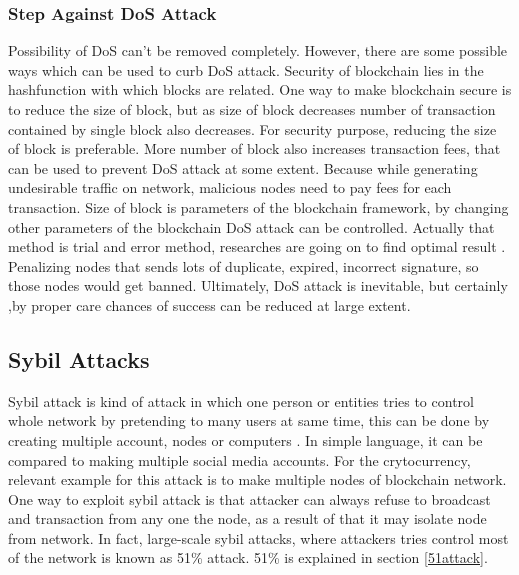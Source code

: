 \documentclass[a4paper,twoside,12pt]{report}
\begin{document}
\begin{spacing}{1.5}
\subsubsection{Step Against DoS Attack}
Possibility of DoS can't be removed completely. However, there are some possible ways which can be used to curb DoS attack. Security of blockchain lies in the hashfunction with which blocks are related. 
One way to make blockchain secure is to reduce the size of block, but as size of block decreases number of transaction contained by single block also decreases. For security purpose, reducing the size of block is preferable. More number of block also increases transaction fees, that can be used to prevent DoS attack at some extent. Because while generating undesirable traffic on network, malicious nodes need to pay fees for each transaction. Size of block is parameters of the blockchain framework, by changing other parameters of the blockchain DoS attack can be controlled. Actually that method is trial and error method, researches are going on to find optimal result \cite{zaghloul_beginners_2018}. Penalizing nodes that sends lots of duplicate, expired, incorrect signature, so those nodes would get banned. Ultimately, DoS attack is inevitable, but certainly ,by proper care chances of success can be reduced at large extent.       
\subsection{Sybil Attacks}
Sybil attack is kind of attack in which one person or entities tries to control whole network by pretending to many users at same time, this can be done by creating multiple account, nodes or computers \cite{zaghloul_beginners_2018}. In simple language, it can be compared to making multiple social media accounts. For the crytocurrency, relevant example for this attack is to make multiple nodes of blockchain network. One way to exploit sybil attack is that attacker can always refuse to broadcast and transaction from any one the node, as a result of that it may isolate node from network. In fact, large-scale sybil attacks, where attackers tries control most of the network is known as 51\% attack. 51\% is explained in section \ref{51attack}.

\end{spacing}
\end{document}

